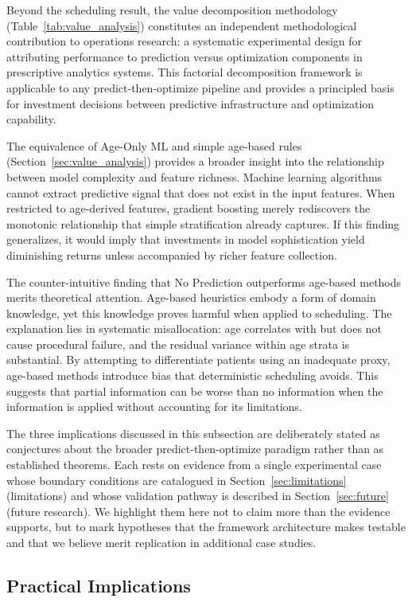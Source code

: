 \documentclass[11pt,a4paper]{article}
\begin{document}
Beyond the scheduling result, the value decomposition methodology (Table~\ref{tab:value_analysis}) constitutes an independent methodological contribution to operations research: a systematic experimental design for attributing performance to prediction versus optimization components in prescriptive analytics systems. This factorial decomposition framework is applicable to any predict-then-optimize pipeline and provides a principled basis for investment decisions between predictive infrastructure and optimization capability.

The equivalence of Age-Only ML and simple age-based rules (Section~\ref{sec:value_analysis}) provides a broader insight into the relationship between model complexity and feature richness. Machine learning algorithms cannot extract predictive signal that does not exist in the input features. When restricted to age-derived features, gradient boosting merely rediscovers the monotonic relationship that simple stratification already captures. If this finding generalizes, it would imply that investments in model sophistication yield diminishing returns unless accompanied by richer feature collection.

The counter-intuitive finding that No Prediction outperforms age-based methods merits theoretical attention. Age-based heuristics embody a form of domain knowledge, yet this knowledge proves harmful when applied to scheduling. The explanation lies in systematic misallocation: age correlates with but does not cause procedural failure, and the residual variance within age strata is substantial. By attempting to differentiate patients using an inadequate proxy, age-based methods introduce bias that deterministic scheduling avoids. This suggests that partial information can be worse than no information when the information is applied without accounting for its limitations.

The three implications discussed in this subsection are deliberately stated as conjectures about the broader predict-then-optimize paradigm rather than as established theorems. Each rests on evidence from a single experimental case whose boundary conditions are catalogued in Section~\ref{sec:limitations} (limitations) and whose validation pathway is described in Section~\ref{sec:future} (future research). We highlight them here not to claim more than the evidence supports, but to mark hypotheses that the framework architecture makes testable and that we believe merit replication in additional case studies.

\subsection{Practical Implications}
\end{document}

